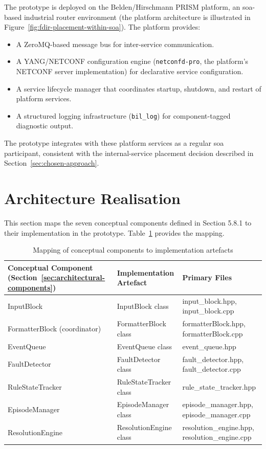 The prototype is deployed on the Belden/Hirschmann PRISM platform, an \gls{soa}-based industrial router environment (the platform architecture is illustrated in Figure~\ref{fig:fdir-placement-within-soa}). The platform provides:

\begin{itemize}
\item A ZeroMQ-based message bus for inter-service communication.
\item A YANG/NETCONF configuration engine (\texttt{netconfd-pro}, the platform's NETCONF server implementation) for declarative service configuration.
\item A service lifecycle manager that coordinates startup, shutdown, and restart of platform services.
\item A structured logging infrastructure (\texttt{bil\_log}) for component-tagged diagnostic output.
\end{itemize}

The prototype integrates with these platform services as a regular \gls{soa} participant, consistent with the internal-service placement decision described in Section~\ref{sec:chosen-approach}.

\section{Architecture Realisation}\label{sec:architecture-realisation}

This section maps the seven conceptual components defined in Section 5.8.1 to their implementation in the prototype. Table~\ref{tab:component-mapping} provides the mapping.

\begin{table}[htbp]
\centering
\caption{Mapping of conceptual components to implementation artefacts}
\label{tab:component-mapping}
\begin{tabular}{p{4cm} p{4cm} p{6cm}}
\toprule
Conceptual Component (Section~\ref{sec:architectural-components}) & Implementation Artefact & Primary Files \\
\midrule
InputBlock & InputBlock class & input\_block.hpp, input\_block.cpp \\
FormatterBlock (coordinator) & FormatterBlock class & formatterBlock.hpp, formatterBlock.cpp \\
EventQueue & EventQueue class & event\_queue.hpp \\
FaultDetector & FaultDetector class & fault\_detector.hpp, fault\_detector.cpp \\
RuleStateTracker & RuleStateTracker class & rule\_state\_tracker.hpp \\
EpisodeManager & EpisodeManager class & episode\_manager.hpp, episode\_manager.cpp \\
ResolutionEngine & ResolutionEngine class & resolution\_engine.hpp, resolution\_engine.cpp \\
\bottomrule
\end{tabular}
\end{table}

